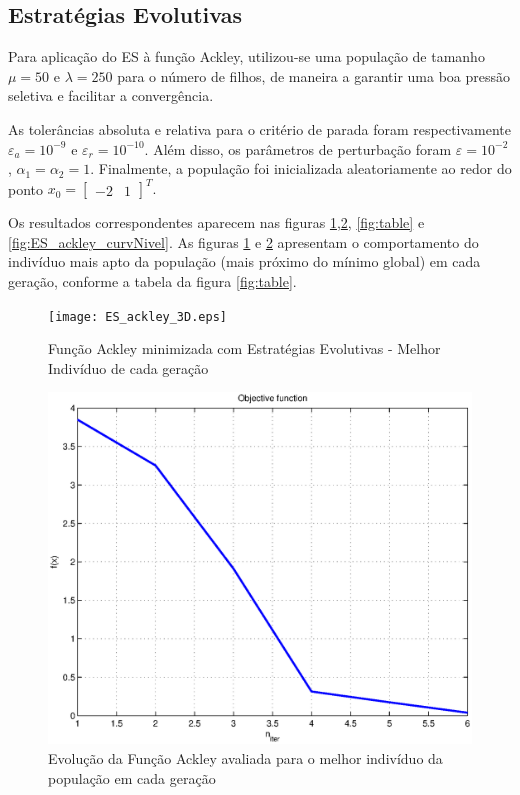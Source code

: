 \documentclass[conference,compsoc]{IEEEtran}
\begin{document}
\subsection{Estratégias Evolutivas}

Para aplicação do ES à função Ackley, utilizou-se uma população de tamanho $\mu=50$ e $\lambda=250$ para o número de filhos, de maneira a garantir uma boa pressão seletiva e facilitar a convergência. 

As tolerâncias absoluta e relativa para o critério de parada foram respectivamente $\varepsilon_a=10^{-9}$ e $\varepsilon_r=10^{-10}$. Além disso, os parâmetros de perturbação foram $\varepsilon=10^{-2}$, $\alpha_1=\alpha_2=1$. Finalmente, a população foi inicializada aleatoriamente ao redor do ponto $x_0 = \begin{bmatrix}-2 &1\end{bmatrix}^T.$

Os resultados correspondentes aparecem nas figuras \ref{fig:ES_ackley_3D},\ref{fig:ES_ackley_f}, \ref{fig:table} e \ref{fig:ES_ackley_curvNivel}. As figuras  \ref{fig:ES_ackley_3D} e \ref{fig:ES_ackley_f} apresentam o comportamento do indivíduo mais apto da população (mais próximo do mínimo global) em cada geração, conforme a tabela da figura \ref{fig:table}. 

\begin{figure}[!htcb]
\centering
\texttt{[image: ES\_ackley\_3D.eps]}
\caption{Função Ackley minimizada com Estratégias Evolutivas - Melhor Indivíduo de cada geração}
\label{fig:ES_ackley_3D}
\end{figure}

\begin{figure}[!htcb]
\centering
\includegraphics[scale=0.45]{ES_ackley_f.eps}
\caption{Evolução da Função Ackley avaliada para o melhor indivíduo da população em cada geração}
\label{fig:ES_ackley_f}
\end{figure}
\end{document}
